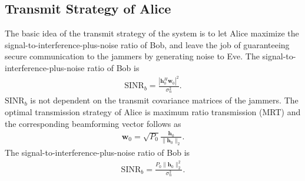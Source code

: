 \documentclass[conference]{IEEEtran}
\begin{document}
\subsection{Transmit Strategy of Alice}
The basic idea of the transmit strategy of the system is to let Alice maximize the signal-to-interference-plus-noise ratio of Bob, and leave the job of guaranteeing secure communication to the jammers by generating noise to Eve.  The signal-to-interference-plus-noise ratio of Bob is 
\begin{eqnarray}
\mathrm{SINR}_b= \frac{\left| \mathbf{h}_{0}^H\mathbf{w}_{0}\right|^2}{\sigma_n^2 }. 
\end{eqnarray}
$\mathrm{SINR}_b$ is not dependent on the transmit covariance matrices of the jammers. The optimal transmission strategy of Alice is maximum ratio transmission (MRT) and the corresponding beamforming vector follows as
\begin{eqnarray}
\mathbf{w}_0 = \sqrt{P_0}\frac{\mathbf{h}_0}{\|\mathbf{h}_0\|_2} \label{eq:optimal_w}.
\end{eqnarray}
The signal-to-interference-plus-noise ratio of Bob is
\begin{eqnarray} 
\mathrm{SINR}_b= \frac{P_0\| \mathbf{h}_{0}\|_2^2}{\sigma_n^2 }.  \label{eq:SINR_b}
\end{eqnarray}
\end{document}

